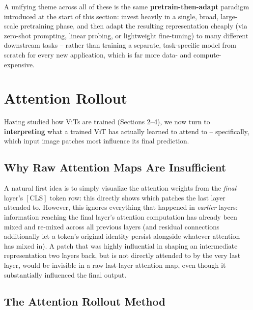 \documentclass[12pt,a4paper]{article}
\begin{document}
\begin{keyidea}
A unifying theme across all of these is the same \textbf{pretrain-then-adapt} paradigm introduced at the start of this section: invest heavily in a single, broad, large-scale pretraining phase, and then adapt the resulting representation cheaply (via zero-shot prompting, linear probing, or lightweight fine-tuning) to many different downstream tasks -- rather than training a separate, task-specific model from scratch for every new application, which is far more data- and compute-expensive.
\end{keyidea}

\newpage

\section{Attention Rollout}

Having studied how ViTs are trained (Sections 2--4), we now turn to \textbf{interpreting} what a trained ViT has actually learned to attend to -- specifically, which input image patches most influence its final prediction.

\subsection{Why Raw Attention Maps Are Insufficient}

\begin{keyidea}
A natural first idea is to simply visualize the attention weights from the \emph{final} layer's $[\text{CLS}]$ token row: this directly shows which patches the last layer attended to. However, this ignores everything that happened in \emph{earlier} layers: information reaching the final layer's attention computation has already been mixed and re-mixed across all previous layers (and residual connections additionally let a token's original identity persist alongside whatever attention has mixed in). A patch that was highly influential in shaping an intermediate representation two layers back, but is not directly attended to by the very last layer, would be invisible in a raw last-layer attention map, even though it substantially influenced the final output.
\end{keyidea}

\subsection{The Attention Rollout Method}
\end{document}
